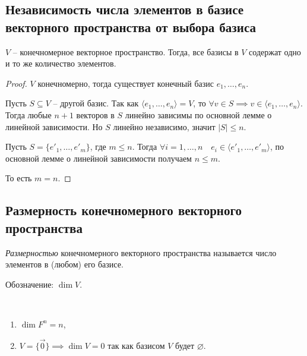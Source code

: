 \subsection{Независимость числа элементов в базисе векторного пространства от выбора базиса}

\begin{proposal}
    $V$ -- конечномерное векторное пространство. Тогда, все базисы в $V$ содержат одно и то же количество элементов.
\end{proposal}

\begin{proof}
    $V$ конечномерно, тогда существует конечный базис $e_1, \dots, e_n$.

    Пусть $S \subseteq V$ -- другой базис. 
    Так как $\langle e_1, \dots, e_n \rangle = V$, то $\forall v \in S \implies v \in \langle e_1, \dots, e_n \rangle$. 
    Тогда любые $n + 1$ векторов в $S$ линейно зависимы по основной лемме о линейной зависимости.  Но $S$ линейно независимо, значит $|S| \leq n$.

    Пусть $S = \{e'_1, \dots, e'_m\}$, где $m \leq n$. Тогда $\forall i = 1, \dots, n \quad e_i \in \langle e'_1, \dots, e'_m \rangle$, по основной лемме о линейной зависимости получаем $n \leq m$.
    
    То есть $m = n$.
\end{proof}


\subsection{Размерность конечномерного векторного пространства}

\begin{definition}
    \textit{Размерностью} конечномерного векторного пространства называется число элементов в (любом) его базисе.

    Обозначение: $\dim V$.
\end{definition}

\begin{example}~
    \begin{enumerate}
    \item $\dim F^n = n$,
    \item $V = \{\overrightarrow{0}\} \implies \dim V = 0$ так как базисом $V$ будет $\varnothing$.
    \end{enumerate}
\end{example}
